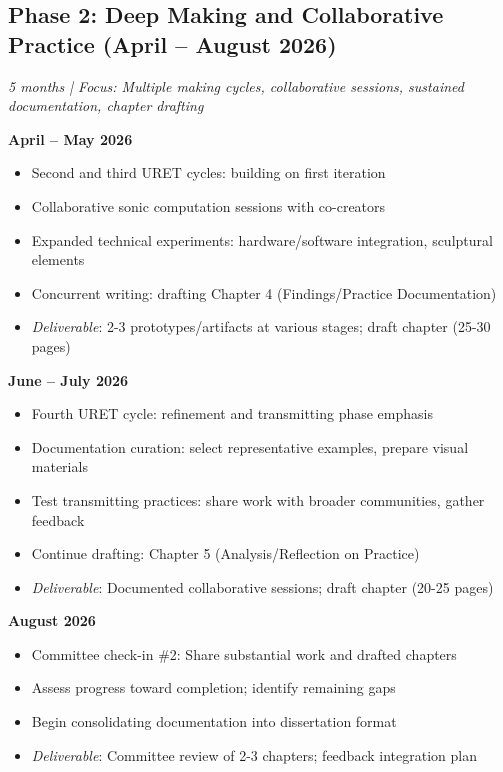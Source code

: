 \subsection*{Phase 2: Deep Making and Collaborative Practice (April – August 2026)}
\textit{5 months | Focus: Multiple making cycles, collaborative sessions, sustained documentation, chapter drafting}

\textbf{April – May 2026}
\begin{itemize}[noitemsep]
	\item Second and third URET cycles: building on first iteration
	\item Collaborative sonic computation sessions with co-creators
	\item Expanded technical experiments: hardware/software integration, sculptural elements
	\item Concurrent writing: drafting Chapter 4 (Findings/Practice Documentation)
	\item \textit{Deliverable}: 2-3 prototypes/artifacts at various stages; draft chapter (25-30 pages)
\end{itemize}

\textbf{June – July 2026}
\begin{itemize}[noitemsep]
	\item Fourth URET cycle: refinement and transmitting phase emphasis
	\item Documentation curation: select representative examples, prepare visual materials
	\item Test transmitting practices: share work with broader communities, gather feedback
	\item Continue drafting: Chapter 5 (Analysis/Reflection on Practice)
	\item \textit{Deliverable}: Documented collaborative sessions; draft chapter (20-25 pages)
\end{itemize}

\textbf{August 2026}
\begin{itemize}[noitemsep]
	\item Committee check-in \#2: Share substantial work and drafted chapters
	\item Assess progress toward completion; identify remaining gaps
	\item Begin consolidating documentation into dissertation format
	\item \textit{Deliverable}: Committee review of 2-3 chapters; feedback integration plan
\end{itemize}

